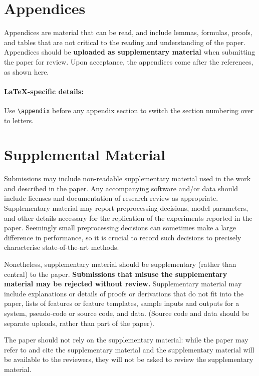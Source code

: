 \documentclass[11pt,a4paper]{article}
\begin{document}




\appendix

\section{Appendices}
\label{sec:appendix}
Appendices are material that can be read, and include lemmas, formulas, proofs, and tables that are not critical to the reading and understanding of the paper. 
Appendices should be \textbf{uploaded as supplementary material} when submitting the paper for review.
Upon acceptance, the appendices come after the references, as shown here.

\paragraph{\LaTeX-specific details:}
Use {\small\verb|\appendix|} before any appendix section to switch the section numbering over to letters.


\section{Supplemental Material}
\label{sec:supplemental}
Submissions may include non-readable supplementary material used in the work and described in the paper.
Any accompanying software and/or data should include licenses and documentation of research review as appropriate.
Supplementary material may report preprocessing decisions, model parameters, and other details necessary for the replication of the experiments reported in the paper.
Seemingly small preprocessing decisions can sometimes make a large difference in performance, so it is crucial to record such decisions to precisely characterise state-of-the-art methods. 

Nonetheless, supplementary material should be supplementary (rather than central) to the paper.
\textbf{Submissions that misuse the supplementary material may be rejected without review.}
Supplementary material may include explanations or details of proofs or derivations that do not fit into the paper, lists of
features or feature templates, sample inputs and outputs for a system, pseudo-code or source code, and data.
(Source code and data should be separate uploads, rather than part of the paper).

The paper should not rely on the supplementary material: while the paper may refer to and cite the supplementary material and the supplementary material will be available to the reviewers, they will not be asked to review the supplementary material.
\end{document}
